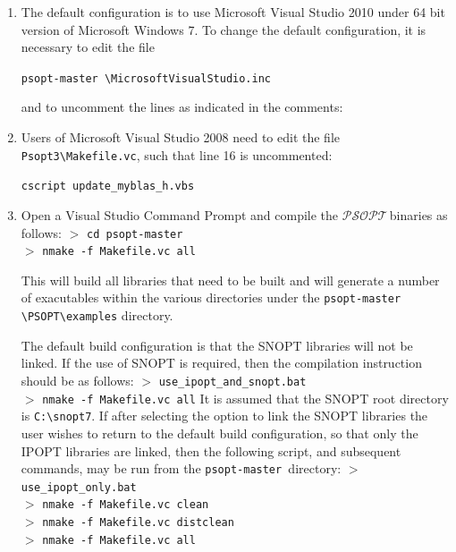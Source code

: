 \documentclass[a4paper,11pt]{report}    %
\newcommand{\psopt}{$\mathcal{PSOPT}$\,}  %
\newcommand{\basedir}{\texttt{psopt-master\,}}
\newenvironment{shadedframe}{%
  \def\FrameCommand{\fcolorbox{black}{shadecolor}}%
  \MakeFramed {\FrameRestore}}
{\endMakeFramed}
\begin{document}
\begin{enumerate}
\item The default configuration is to use Microsoft Visual Studio 2010 under 64 bit version of Microsoft Windows 7.  To change the default configuration, it is necessary to edit the file 

\basedir\verb|\MicrosoftVisualStudio.inc|


and to uncomment the lines as indicated in the comments:
\begin{shadedframe}
\tiny

\normalsize
\end{shadedframe}

\item Users of Microsoft Visual Studio 2008 need to edit the file \verb|Psopt3\Makefile.vc|, such that line 16 is uncommented:

\begin{shadedframe}
\verb|cscript update_myblas_h.vbs|
\end{shadedframe}



\item Open a Visual Studio Command Prompt and compile the \psopt binaries as follows:
\begin{shadedframe}
  $>$ \texttt{cd \basedir} \\
  $>$ \verb|nmake -f Makefile.vc all|
\end{shadedframe}

This will build all libraries that need to be built and will generate a number of exacutables within the various
directories under the \texttt{\basedir}\verb|\PSOPT\examples| directory. 

The default build configuration is that the SNOPT libraries will not be linked. 
If the use of SNOPT is required, then the compilation instruction should be
as follows:
\begin{shadedframe}
   $>$  \verb|use_ipopt_and_snopt.bat| \\
   $>$  \verb|nmake -f Makefile.vc all|
\end{shadedframe}
It is assumed that the SNOPT root directory is \verb|C:\snopt7|.  If after selecting the option to link the SNOPT libraries the user wishes to return to the default build configuration,
so that only the IPOPT libraries are linked, then the following script, and subsequent commands, may be run from the \basedir directory:
\begin{shadedframe}
   $>$  \verb|use_ipopt_only.bat| \\
   $>$  \verb|nmake -f Makefile.vc clean| \\
   $>$  \verb|nmake -f Makefile.vc distclean| \\
   $>$  \verb|nmake -f Makefile.vc all| \\
\end{shadedframe}


\end{enumerate}
\end{document}
